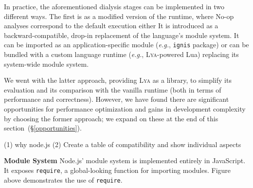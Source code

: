 \documentclass[letterpaper,twocolumn,10pt]{article}
\def\eg{{\em e.g.}, }
\newcommand{\heading}[1]{\vspace{2pt}\noindent\textbf{#1}\enspace}
\newcommand{\ttt}[1]{\texttt{#1}}
\newcommand{\sx}[1]{(\S\ref{#1})}
\newcommand{\sys}{{\scshape Lya}\xspace}
\newcommand{\fixme}[1]{{\color{red}#1}}
\begin{document}
In practice, the aforementioned dialysis stages can be implemented in two different ways.
The first is as a modified version of the runtime, where 
No-op analyses correspond to the default execution
  either 
It is introduced as a backward-compatible, drop-in replacement of the language's module system.
It can be imported as an application-specific module (\eg \ttt{ignis} package) or can be bundled with a custom language runtime (\eg \sys-powered Lua) replacing its system-wide module system.

We went with the latter approach, providing \sys as a library, to simplify its evaluation and its comparison with the vanilla runtime (both in terms of performance and correctness).
However, we have found there are significant opportunities for performance optimization and gains in development complexity by choosing the former approach;
  we expand on these at the end of this section~\sx{opportunities}.


(1) why node.js
(2) Create a table of compatibility and show individual aspects

\heading{Module System}
Node.js' module system is implemented entirely in JavaScript.
It exposes \ttt{require}, a global-looking function for importing modules.
\fixme{Figure} above demonstrates the use of \ttt{require}.

% 
\end{document}
